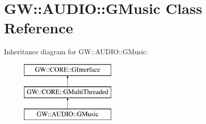 \hypertarget{class_g_w_1_1_a_u_d_i_o_1_1_g_music}{}\section{GW\+:\+:A\+U\+D\+IO\+:\+:G\+Music Class Reference}
\label{class_g_w_1_1_a_u_d_i_o_1_1_g_music}
Inheritance diagram for GW\+:\+:A\+U\+D\+IO\+:\+:G\+Music\+:\begin{figure}[H]
\begin{center}
\leavevmode
\includegraphics[height=3.000000cm]{class_g_w_1_1_a_u_d_i_o_1_1_g_music}
\end{center}
\end{figure}
